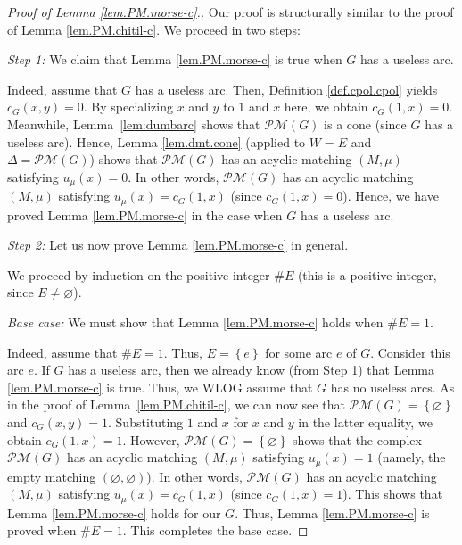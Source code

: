 \documentclass[12pt]{amsart}
\theoremstyle{definition}
\newcommand{\Pm}[1]{\mathcal{PM}\left(#1\right)}
\begin{document}
\begin{proof}
[Proof of Lemma \ref{lem.PM.morse-c}.]Our proof is structurally
similar to the proof of Lemma \ref{lem.PM.chitil-c}.
We proceed in two steps:

\textit{Step 1:} We claim that Lemma \ref{lem.PM.morse-c} is true when $G$ has
a useless arc.

Indeed, assume that $G$ has a useless arc. Then, Definition
\ref{def.cpol.cpol} yields $c_{G}\left(  x,y\right)  =0$. By specializing $x$
and $y$ to $1$ and $x$ here, we obtain $c_{G}\left(  1,x\right)  =0$.
Meanwhile,
Lemma~\ref{lem:dumbarc} shows that $\Pm{G}$ is a cone (since $G$ has
a useless arc). Hence, Lemma \ref{lem.dmt.cone} (applied to $W=E$ and
$\Delta=\Pm{G}$) shows that $\Pm{G}$ has an acyclic matching
$\left(  M,\mu\right)  $ satisfying
$u_{\mu}\left(  x\right)  =0$. In other words, $\Pm{G}
$ has an acyclic matching $\left(  M,\mu\right)  $ satisfying $u_{\mu}\left(
x\right)  =c_{G}\left(  1,x\right)  $ (since $c_{G}\left(  1,x\right)  =0$).
Hence, we have proved Lemma \ref{lem.PM.morse-c} in the case when $G$ has a
useless arc.

\textit{Step 2:} Let us now prove Lemma \ref{lem.PM.morse-c} in general.

We proceed by induction on the positive integer $\#E$ (this is a positive
integer, since $E\neq\varnothing$).

\textit{Base case:} We must show that Lemma \ref{lem.PM.morse-c} holds when
$\#E=1$.

Indeed, assume that $\#E=1$. Thus, $E=\left\{  e\right\}  $ for some arc $e$
of $G$. Consider this arc $e$. If $G$ has a useless arc, then we already
know (from Step 1) that Lemma \ref{lem.PM.morse-c} is true. Thus, we WLOG
assume that $G$ has no useless arcs. As in the proof of
Lemma~\ref{lem.PM.chitil-c}, we can now see that
$\Pm{G}=\left\{  \varnothing\right\}  $ and $c_{G}\left(  x,y\right)  =1$.
Substituting $1$ and $x$ for $x$ and $y$ in the latter equality, we obtain
$c_{G}\left(  1,x\right)  =1$. However, $\Pm{G}
=\left\{  \varnothing\right\}  $ shows that the complex $\Pm{G}$ has an acyclic matching $\left(  M,\mu\right)  $ satisfying
$u_{\mu}\left(  x\right)  =1$ (namely, the empty matching $\left(
\varnothing,\varnothing\right)  $). In other words, $\Pm{G}$ has an acyclic matching $\left(  M,\mu\right)  $ satisfying
$u_{\mu}\left(  x\right)  =c_{G}\left(  1,x\right)  $ (since $c_{G}\left(
1,x\right)  =1$). This shows that Lemma \ref{lem.PM.morse-c} holds for our
$G$. Thus, Lemma \ref{lem.PM.morse-c} is proved when $\#E=1$. This completes
the base case.


\end{proof}
\end{document}
